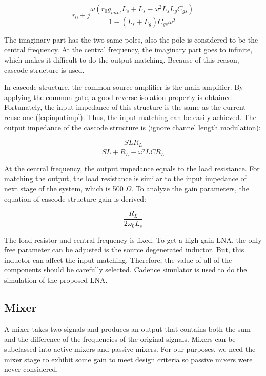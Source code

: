 \begin{equation} 
  	r_0 + j\frac{\omega(r_0g_{mtot}L_s+L_s-\omega^2L_sL_gC_{gs})}{1-(L_s+L_g)C_{gs}\omega^2}
\end{equation}

The imaginary part has the two same poles, also the pole is considered to be the central frequency. At the central frequency, the imaginary part goes to infinite, which makes it difficult to do the output matching. Because of this reason, cascode structure is used.

In cascode structure, the common source amplifier is the main amplifier. By applying the common gate, a good reverse isolation property is obtained. Fortunately, the input impedance of this structure is the same as the current reuse one (\ref{eq:inputimp}). Thus, the input matching can be easily achieved. The output impedance of the cascode structure is (ignore channel length modulation):

\begin{equation} 
  	\frac{SLR_L}{SL+R_L-\omega^2LCR_L}
\end{equation}

At the central frequency, the output impedance equals to the load resistance. For matching the output, the load resistance is similar to the input impedance of next stage of the system, which is 500 $\Omega$. To analyze the gain parameters, the equation of cascode structure gain is derived: 

\begin{equation} 
  	\frac{R_L}{2\omega_0L_s}
\end{equation}

The load resistor and central frequency is fixed. To get a high gain LNA, the only free parameter can be adjusted is the source degenerated inductor. But, this inductor can affect the input matching. Therefore, the value of all of the components should be carefully selected. Cadence simulator is used to do the simulation of the proposed LNA. 

\subsection{Mixer}

A mixer takes two signals and produces an output that contains both the sum and the difference of the frequencies of the original signals. Mixers can be subclassed into active mixers and passive mixers. For our purposes, we need the mixer stage to exhibit some gain to meet design criteria so passive mixers were never considered. 

